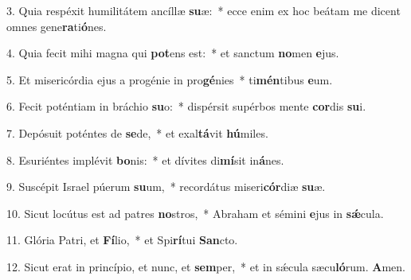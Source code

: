 \item 3. Quia respéxit humilitátem ancíllæ \textbf{su}æ:~* ecce enim ex hoc beátam me dicent omnes gene\textbf{ra}ti\textbf{ó}nes.

\item 4. Quia fecit mihi magna qui \textbf{pot}ens est:~* et sanctum \textbf{no}men \textbf{e}jus.

\item 5. Et misericórdia ejus a progénie in pro\textbf{gé}nies~* ti\textbf{mén}tibus \textbf{e}um.

\item 6. Fecit poténtiam in bráchio \textbf{su}o:~* dispérsit supérbos mente \textbf{cor}dis \textbf{su}i.

\item 7. Depósuit poténtes de \textbf{se}de,~* et exal\textbf{tá}vit \textbf{hú}miles.

\item 8. Esuriéntes implévit \textbf{bo}nis:~* et dívites di\textbf{mí}sit in\textbf{á}nes.

\item 9. Suscépit Israel púerum \textbf{su}um,~* recordátus miseri\textbf{cór}diæ \textbf{su}æ.

\item 10. Sicut locútus est ad patres \textbf{no}stros,~* Abraham et sémini \textbf{e}jus in \textbf{sǽ}cula.

\item 11. Glória Patri, et \textbf{Fí}lio,~* et Spi\textbf{rí}tui \textbf{San}cto.

\item 12. Sicut erat in princípio, et nunc, et \textbf{sem}per,~* et in sǽcula sæcu\textbf{ló}rum. \textbf{A}men.